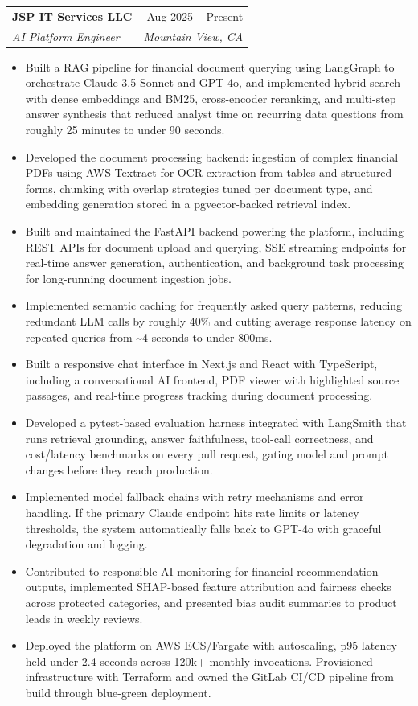 \documentclass[letterpaper,10.5pt]{article}
\makeatletter
\newcommand{\resumeItem}[1]{
  \item\small{
    {#1 \vspace{-2pt}}
  }
}
\newcommand{\resumeSubheading}[4]{
  \vspace{-2pt}\item
    \begin{tabular*}{0.97\textwidth}[t]{l@{\extracolsep{\fill}}r}
      \textbf{#1} & #2 \\
      \textit{\small#3} & \textit{\small #4} \\
    \end{tabular*}\vspace{-7pt}
}
\newcommand{\resumeItemListStart}{\begin{itemize}}
\newcommand{\resumeItemListEnd}{\end{itemize}\vspace{-5pt}}
\makeatother
\begin{document}
\resumeSubheading
  {JSP IT Services LLC}{Aug 2025 -- Present}
  {AI Platform Engineer}{Mountain View, CA}
  \resumeItemListStart
    \resumeItem{Built a RAG pipeline for financial document querying using LangGraph to orchestrate Claude 3.5 Sonnet and GPT-4o, and implemented hybrid search with dense embeddings and BM25, cross-encoder reranking, and multi-step answer synthesis that reduced analyst time on recurring data questions from roughly 25 minutes to under 90 seconds.}
    \resumeItem{Developed the document processing backend: ingestion of complex financial PDFs using AWS Textract for OCR extraction from tables and structured forms, chunking with overlap strategies tuned per document type, and embedding generation stored in a pgvector-backed retrieval index.}
    \resumeItem{Built and maintained the FastAPI backend powering the platform, including REST APIs for document upload and querying, SSE streaming endpoints for real-time answer generation, authentication, and background task processing for long-running document ingestion jobs.}
    \resumeItem{Implemented semantic caching for frequently asked query patterns, reducing redundant LLM calls by roughly 40\% and cutting average response latency on repeated queries from \textasciitilde4 seconds to under 800ms.}
    \resumeItem{Built a responsive chat interface in Next.js and React with TypeScript, including a conversational AI frontend, PDF viewer with highlighted source passages, and real-time progress tracking during document processing.}
    \resumeItem{Developed a pytest-based evaluation harness integrated with LangSmith that runs retrieval grounding, answer faithfulness, tool-call correctness, and cost/latency benchmarks on every pull request, gating model and prompt changes before they reach production.}
    \resumeItem{Implemented model fallback chains with retry mechanisms and error handling. If the primary Claude endpoint hits rate limits or latency thresholds, the system automatically falls back to GPT-4o with graceful degradation and logging.}
    \resumeItem{Contributed to responsible AI monitoring for financial recommendation outputs, implemented SHAP-based feature attribution and fairness checks across protected categories, and presented bias audit summaries to product leads in weekly reviews.}
    \resumeItem{Deployed the platform on AWS ECS/Fargate with autoscaling, p95 latency held under 2.4 seconds across 120k+ monthly invocations. Provisioned infrastructure with Terraform and owned the GitLab CI/CD pipeline from build through blue-green deployment.}
  \resumeItemListEnd
\end{document}
